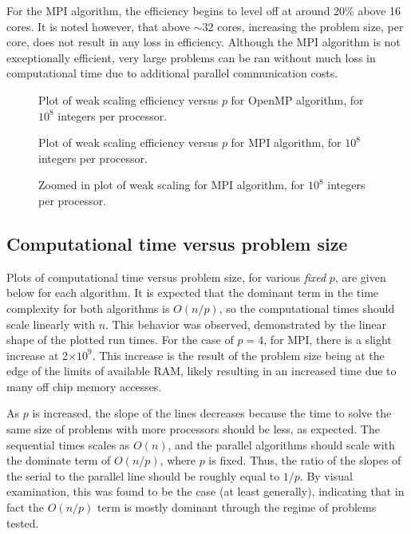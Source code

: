 \documentclass[12pt]{article}
\begin{document}
{{{{For the MPI algorithm, the efficiency begins to level off at around 20\% above 16 cores.  It is noted however,
that above $\sim$32 cores, increasing the problem size, per core, does not result
in any loss in efficiency.  Although the MPI algorithm is not exceptionally
efficient, very large problems can be ran without much loss in computational time due
to additional parallel communication costs.

     \begin{figure}[htbp!]
         \centering
           \caption{Plot of weak scaling efficiency versus $p$ for OpenMP algorithm,
               for $10^8$ integers per processor.\label{ompw}}
     \end{figure}
\begin{figure}[htbp!]
           \centering
           \caption{Plot of weak scaling efficiency versus $p$ for MPI algorithm, for $10^8$ integers
               per processor.\label{mpiw}}
     \end{figure}
\begin{figure}[htbp!]
           \centering
           \caption{Zoomed in plot of weak scaling for MPI
           algorithm, for $10^8$ integers per processor.\label{mpizoomw}}
     \end{figure}
\clearpage
\subsection{Computational time versus problem size}

Plots of computational time versus problem size, for various \emph{fixed} $p$, are
given below for each algorithm.  It is expected that the dominant term in the
time complexity for both algorithms is $O(n/p)$, so the computational times should scale linearly with $n$.
This behavior was observed, demonstrated by the linear shape of the plotted run times.
For the case of $p=4$, for MPI, there is a slight
increase at 2$\times 10^9$. This increase is the result of the problem size being at the edge of the limits
of available RAM, likely resulting in an increased time due to many off chip memory
accesses.   

As $p$ is increased, the slope of the lines decreases because the time to solve the
same size of problems with more processors should be less, as expected.
The sequential times scales as $O(n)$, and the parallel algorithms should scale with
the dominate term of $O(n/p)$, where $p$ is fixed.  Thus, the ratio of the slopes of the
serial to the parallel line should be roughly equal to $1/p$.  By visual examination, this was found to be the
case (at least generally), indicating that in fact the $O(n/p)$ term is mostly
dominant through the regime of problems tested. 

}}}}
\end{document}
